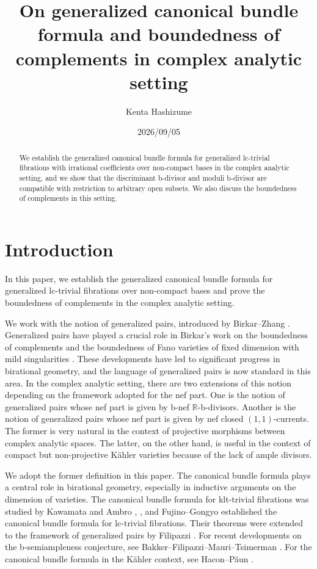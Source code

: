 \documentclass[12pt]{amsart}
\title[Complex analytic generalized pairs]{On generalized canonical bundle formula and boundedness of complements in complex analytic setting}
\author{Kenta Hashizume}
\date{2026/09/05}
\theoremstyle{definition}
\begin{document}
\begin{abstract}
We establish the generalized canonical bundle formula for generalized lc-trivial fibrations with irrational coefficients over non-compact bases in the complex analytic setting, and we show that the discriminant b-divisor and moduli b-divisor are compatible with restriction to arbitrary open subsets. We also discuss the boundedness of complements in this setting. 
\end{abstract}

\maketitle

\tableofcontents



\section{Introduction}\label{sec--intro}

In this paper, we establish the generalized canonical bundle formula for generalized lc-trivial fibrations over non-compact bases and prove the boundedness of complements in the complex analytic setting. 

We work with the notion of generalized pairs, introduced by Birkar--Zhang \cite{bz}. 
Generalized pairs have played a crucial role in Birkar's work on the boundedness of complements \cite{birkar-compl} and the boundedness of Fano varieties of fixed dimension with mild singularities \cite{birkar-bab}. 
These developments have led to significant progress in birational geometry, and the language of generalized pairs is now standard in this area. 
In the complex analytic setting, there are two extensions of this notion depending on the framework adopted for the nef part. 
One is the notion of generalized pairs whose nef part is given by b-nef $\mathbb{R}$-b-divisors. 
Another is the notion of generalized pairs whose nef part is given by nef closed $(1,1)$-currents. 
The former is very natural in the context of projective morphisms between complex analytic spaces. 
The latter, on the other hand, is useful in the context of compact but non-projective K\"{a}hler varieties because of the lack of ample divisors.   

We adopt the former definition in this paper. 
The canonical bundle formula plays a central role in birational geometry, especially in inductive arguments on the dimension of varieties.
The canonical bundle formula for klt-trivial fibrations was studied by Kawamata \cite{kawamata-subadjunction-II} and Ambro \cite{ambro1}, \cite{ambro2}, and
Fujino--Gongyo \cite{fg-lctrivial} established the canonical bundle formula for lc-trivial fibrations. 
Their theorems were extended to the framework of generalized pairs by Filipazzi \cite{filipazzi-gen-can-bundle-formula}. 
For recent developments on the b-semiampleness conjecture, see Bakker--Filipazzi--Mauri--Tsimerman \cite{bfmt}. 
For the canonical bundle formula in the K\"{a}hler context, see Hacon--P\u{a}un \cite{haconpaun}. 
\end{document}
